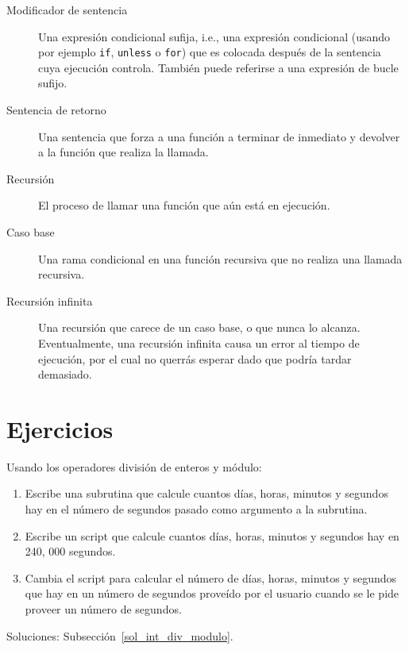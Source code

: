 \begin{description}
\item[Modificador de sentencia] Una expresión condicional sufija,
i.e., una expresión condicional (usando por ejemplo {\tt if}, {\tt unless} o 
{\tt for}) que es colocada después de la sentencia cuya ejecución
controla. También puede referirse a una expresión de bucle sufijo.

\item[Sentencia de retorno] Una sentencia que forza a una 
función a terminar de inmediato y devolver a la función
que realiza la llamada.

\item[Recursión]  El proceso de llamar una función 
que aún está en ejecución.

\item[Caso base]  Una rama condicional en una función
recursiva que no realiza una llamada recursiva.

\item[Recursión infinita]  Una recursión que carece
de un caso base, o que nunca lo alcanza. Eventualmente, 
una recursión infinita causa un error al tiempo de ejecución,
por el cual no querrás esperar dado que podría tardar demasiado.

\end{description}

\section{Ejercicios}
%

\begin{exercise}
%
Usando los operadores división de enteros y módulo:
\label{int_div_modulo}

\begin{enumerate}

\item Escribe una subrutina que calcule cuantos días, horas, minutos y segundos
hay en el número de segundos pasado como argumento a la subrutina.

\item Escribe un script que calcule cuantos días, horas, minutos y segundos 
hay en 240, 000 segundos.

\item Cambia el script para calcular el número de días, horas, minutos y segundos
que hay en un número de segundos proveído por el usuario cuando se le
pide proveer un número de segundos.

\end{enumerate}

Soluciones: Subsección~\ref{sol_int_div_modulo}.

\end{exercise}


